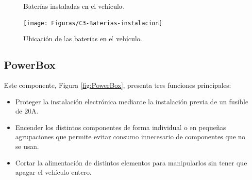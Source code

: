 \begin{figure}[h!]
\begin{center}
	\caption{Baterías instaladas en el vehículo.}
\end{center}
\end{figure}

\begin{figure}[h!]
  \centering
    \texttt{[image: Figuras/C3-Baterias-instalacion]}
  \caption{Ubicación de las baterías en el vehículo.}
  \label{fig:baterias-asientos}
\end{figure}

\subsection{PowerBox}
Este componente, Figura \ref{fig:PowerBox}, presenta tres funciones principales:
\begin{itemize}
\item Proteger la instalación electrónica mediante la instalación previa de un fusible de 20A.

\item Encender los distintos componentes de forma individual o en pequeñas agrupaciones que permite evitar consumo innecesario de componentes que no se usan.

\item Cortar la alimentación de distintos elementos para manipularlos sin tener que apagar el vehículo entero.
\end{itemize}

